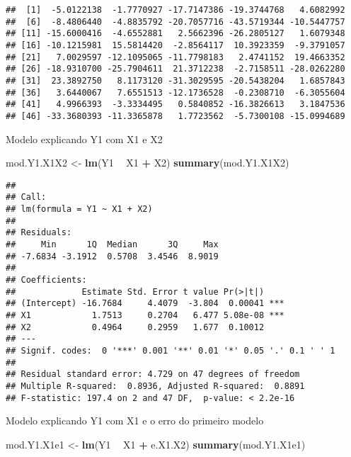 \documentclass[]{article}
\newenvironment{Shaded}{\begin{snugshade}}{\end{snugshade}}
\newcommand{\KeywordTok}[1]{\textcolor[rgb]{0.13,0.29,0.53}{\textbf{#1}}}
\newcommand{\StringTok}[1]{\textcolor[rgb]{0.31,0.60,0.02}{#1}}
\newcommand{\OperatorTok}[1]{\textcolor[rgb]{0.81,0.36,0.00}{\textbf{#1}}}
\newcommand{\NormalTok}[1]{#1}
\begin{document}
\begin{verbatim}
##  [1]  -5.0122138  -1.7770927 -17.7147386 -19.3744768   4.6082992
##  [6]  -8.4806440  -4.8835792 -20.7057716 -43.5719344 -10.5447757
## [11] -15.6000416  -4.6552881   2.5662396 -26.2805127   1.6079348
## [16] -10.1215981  15.5814420  -2.8564117  10.3923359  -9.3791057
## [21]   7.0029597 -12.1095065 -11.7798183   2.4741152  19.4663352
## [26] -18.9310700 -25.7904611  21.3712238  -2.7158511 -28.0262280
## [31]  23.3892750   8.1173120 -31.3029595 -20.5438204   1.6857843
## [36]   3.6440067   7.6551513 -12.1736528  -0.2308710  -6.3055604
## [41]   4.9966393  -3.3334495   0.5840852 -16.3826613   3.1847536
## [46] -33.3680393 -11.3365878   1.7723562  -5.7300108 -15.0994689
\end{verbatim}

Modelo explicando Y1 com X1 e X2

\begin{Shaded}
\begin{Highlighting}[]
\NormalTok{mod.Y1.X1X2 <-}\StringTok{ }\KeywordTok{lm}\NormalTok{(Y1 }\OperatorTok{~}\StringTok{ }\NormalTok{X1 }\OperatorTok{+}\StringTok{ }\NormalTok{X2)}
\KeywordTok{summary}\NormalTok{(mod.Y1.X1X2)}
\end{Highlighting}
\end{Shaded}

\begin{verbatim}
## 
## Call:
## lm(formula = Y1 ~ X1 + X2)
## 
## Residuals:
##     Min      1Q  Median      3Q     Max 
## -7.6834 -3.1912  0.5708  3.4546  8.9019 
## 
## Coefficients:
##             Estimate Std. Error t value Pr(>|t|)    
## (Intercept) -16.7684     4.4079  -3.804  0.00041 ***
## X1            1.7513     0.2704   6.477 5.08e-08 ***
## X2            0.4964     0.2959   1.677  0.10012    
## ---
## Signif. codes:  0 '***' 0.001 '**' 0.01 '*' 0.05 '.' 0.1 ' ' 1
## 
## Residual standard error: 4.729 on 47 degrees of freedom
## Multiple R-squared:  0.8936, Adjusted R-squared:  0.8891 
## F-statistic: 197.4 on 2 and 47 DF,  p-value: < 2.2e-16
\end{verbatim}

Modelo explicando Y1 com X1 e o erro do primeiro modelo

\begin{Shaded}
\begin{Highlighting}[]
\NormalTok{mod.Y1.X1e1 <-}\StringTok{ }\KeywordTok{lm}\NormalTok{(Y1 }\OperatorTok{~}\StringTok{ }\NormalTok{X1 }\OperatorTok{+}\StringTok{ }\NormalTok{e.X1.X2)}
\KeywordTok{summary}\NormalTok{(mod.Y1.X1e1)}
\end{Highlighting}
\end{Shaded}
\end{document}
